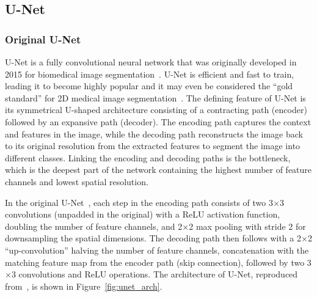 \subsection{U-Net}

\subsubsection{Original U-Net}

U-Net is a fully convolutional neural network that was originally developed in 2015 for biomedical image segmentation~\cite{Ronneberger_Fischer_Brox_2015}. U-Net is efficient and fast to train, leading it to become highly popular and it may even be considered the \enquote{gold standard} for 2D medical image segmentation~\cite{Sengara_2022}. The defining feature of U-Net is its symmetrical U-shaped architecture consisting of a contracting path (encoder) followed by an expansive path (decoder). The encoding path captures the context and features in the image, while the decoding path reconstructs the image back to its original resolution from the extracted features to segment the image into different classes. Linking the encoding and decoding paths is the bottleneck, which is the deepest part of the network containing the highest number of feature channels and lowest spatial resolution.

In the original U-Net~\cite{Ronneberger_Fischer_Brox_2015}, each step in the encoding path consists of two 3$\times$3 convolutions (unpadded in the original) with a ReLU activation function, doubling the number of feature channels, and 2$\times$2 max pooling with stride 2 for downsampling the spatial dimensions. The decoding path then follows with a 2$\times$2 \enquote{up-convolution} halving the number of feature channels, concatenation with the matching feature map from the encoder path (skip connection), followed by two 3$\times$3 convolutions and ReLU operations. The architecture of U-Net, reproduced from~\cite{Ronneberger_Fischer_Brox_2015}, is shown in Figure~\ref{fig:unet_arch}.

